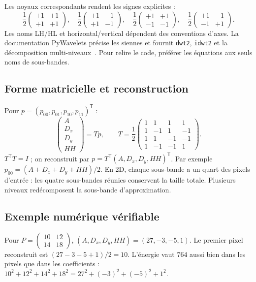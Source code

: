 Les noyaux correspondants rendent les signes explicites :
\begin{equation}
\frac12\begin{pmatrix}+1&+1\\+1&+1\end{pmatrix},\quad
\frac12\begin{pmatrix}+1&-1\\+1&-1\end{pmatrix},\quad
\frac12\begin{pmatrix}+1&+1\\-1&-1\end{pmatrix},\quad
\frac12\begin{pmatrix}+1&-1\\-1&+1\end{pmatrix}.
\end{equation}
Les noms LH/HL et horizontal/vertical dépendent des conventions d'axes.
La documentation PyWavelets précise les siennes et fournit
\texttt{dwt2}, \texttt{idwt2} et la décomposition multi-niveaux~\cite{pywtHaar}.
Pour relire le code, préférer les équations aux seuls noms de sous-bandes.

\subsection{Forme matricielle et reconstruction}
Pour $p=(p_{00},p_{01},p_{10},p_{11})^{\mathsf T}$ :
\begin{equation}
\begin{pmatrix}A\\D_x\\D_y\\HH\end{pmatrix}
=T p,\qquad
T=\frac12\begin{pmatrix}
1&1&1&1\\1&-1&1&-1\\1&1&-1&-1\\1&-1&-1&1
\end{pmatrix}.
\end{equation}
$T^{\mathsf T}T=I$ ; on reconstruit par $p=T^{\mathsf T}(A,D_x,D_y,HH)^{\mathsf T}$.
Par exemple $p_{00}=(A+D_x+D_y+HH)/2$.
En 2D, chaque sous-bande a un quart des pixels d'entrée : les quatre
sous-bandes réunies conservent la taille totale. Plusieurs niveaux
redécomposent la sous-bande d'approximation.

\subsection{Exemple numérique vérifiable}
Pour $P=\begin{pmatrix}10&12\\14&18\end{pmatrix}$,
$(A,D_x,D_y,HH)=(27,-3,-5,1)$.
Le premier pixel reconstruit est $(27-3-5+1)/2=10$.
L'énergie vaut $764$ aussi bien dans les pixels que dans les coefficients :
$10^2+12^2+14^2+18^2=27^2+(-3)^2+(-5)^2+1^2$.

